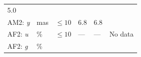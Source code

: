 \documentclass[DM,toc]{lsstdoc}
\begin{document}
\begin{longtable}[]{@{}llllll@{}}
\begin{minipage}[t]{0.12\columnwidth}
5.0\strut
\end{minipage} & \begin{minipage}[t]{0.17\columnwidth}\raggedright\strut
\strut
\end{minipage}\tabularnewline
\begin{minipage}[t]{0.12\columnwidth}\raggedright\strut
AM2: \emph{y}\strut
\end{minipage} & \begin{minipage}[t]{0.06\columnwidth}\raggedright\strut
mas\strut
\end{minipage} & \begin{minipage}[t]{0.14\columnwidth}\raggedright\strut
\(\leq 10\)\strut
\end{minipage} & \begin{minipage}[t]{0.12\columnwidth}\raggedright\strut
6.8\strut
\end{minipage} & \begin{minipage}[t]{0.12\columnwidth}\raggedright\strut
6.8\strut
\end{minipage} & \begin{minipage}[t]{0.17\columnwidth}\raggedright\strut
\strut
\end{minipage}\tabularnewline
\begin{minipage}[t]{0.12\columnwidth}\raggedright\strut
AF2: \emph{u}\strut
\end{minipage} & \begin{minipage}[t]{0.06\columnwidth}\raggedright\strut
\%\strut
\end{minipage} & \begin{minipage}[t]{0.14\columnwidth}\raggedright\strut
\(\leq 10\)\strut
\end{minipage} & \begin{minipage}[t]{0.12\columnwidth}\raggedright\strut
---\strut
\end{minipage} & \begin{minipage}[t]{0.12\columnwidth}\raggedright\strut
---\strut
\end{minipage} & \begin{minipage}[t]{0.17\columnwidth}\raggedright\strut
No data\strut
\end{minipage}\tabularnewline
\begin{minipage}[t]{0.12\columnwidth}\raggedright\strut
AF2: \emph{g}\strut
\end{minipage} & \begin{minipage}[t]{0.06\columnwidth}\raggedright\strut
\%\strut
\end{minipage} & \begin{minipage}[t]{0.14\columnwidth}\raggedright\strut

\end{minipage}
\end{longtable}
\end{document}
